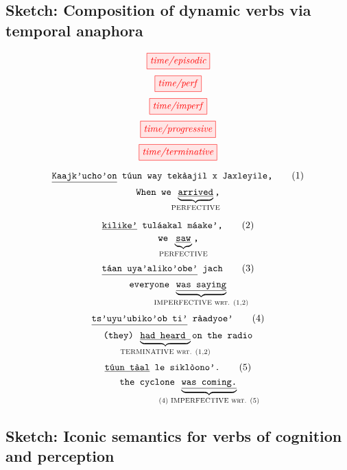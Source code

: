 \subsection{Sketch: Composition of dynamic verbs via temporal anaphora}

\begin{defn}
\[\tikzfig{time/episodic}\]
\[\tikzfig{time/perf}\]
\[\tikzfig{time/imperf}\]
\[\tikzfig{time/progressive}\]
\[\tikzfig{time/terminative}\]
\end{defn}

\begin{example}
\[\texttt{\underline{Kaajk'ucho'on} t\'{u}un way tek\`{a}ajil x Jaxleyile,}\tag{1}\]
\[\texttt{When we }\underbrace{\texttt{\underline{arrived}}}_{\textsc{\makebox[0pt]{PERFECTIVE}}}\texttt{,}\]

\[\texttt{\underline{kilike'} tul\'{a}akal m\'{a}ake',}\tag{2}\]
\[\texttt{we } \underbrace{\texttt{\underline{saw}}}_{\textsc{\makebox[0pt]{PERFECTIVE}}}\texttt{,}\]
\[\texttt{\underline{t\'{a}an uya'aliko'obe'} jach}\tag{3}\]
\[\texttt{everyone }\underbrace{\texttt{\underline{was saying}}}_{\textsc{\makebox[0pt]{IMPERFECTIVE wrt. (1,2)}}}\]
\[\texttt{\underline{ts'uyu'ubiko'ob ti'} r\`{a}adyoe'}\tag{4}\]
\[\texttt{(they) }\underbrace{\texttt{\underline{had heard }}}_{\textsc{\makebox[0pt]{TERMINATIVE wrt. (1,2)}}}\texttt{on the radio}\]
\[\texttt{\underline{t\'{u}un t\`{a}al} le sikl\`{o}ono'.}\tag{5}\]
\[\texttt{the cyclone }\underbrace{\texttt{\underline{was coming.}}}_{\textsc{\makebox[0pt]{(4) IMPERFECTIVE wrt. (5)}}}\]
\end{example}

\subsection{Sketch: Iconic semantics for verbs of cognition and perception}